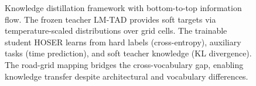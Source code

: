 \begin{figure}[t]
    \caption{Knowledge distillation framework with bottom-to-top information flow. The frozen teacher LM-TAD provides soft targets via temperature-scaled distributions over grid cells. The trainable student HOSER learns from hard labels (cross-entropy), auxiliary tasks (time prediction), and soft teacher knowledge (KL divergence). The road-grid mapping bridges the cross-vocabulary gap, enabling knowledge transfer despite architectural and vocabulary differences.}
    \label{fig:distillation-framework}
\end{figure}
